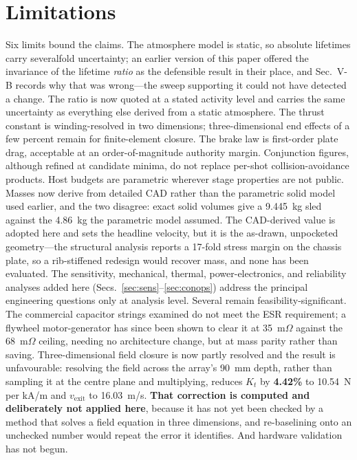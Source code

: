 \documentclass[conference]{IEEEtran}
\begin{document}
\section{Limitations}\label{sec:lim}
Six limits bound the claims. The atmosphere model is static, so absolute lifetimes carry severalfold uncertainty; an earlier version of this paper offered the invariance of the lifetime \emph{ratio} as the defensible result in their place, and Sec.~V-B records why that was wrong---the sweep supporting it could not have detected a change. The ratio is now quoted at a stated activity level and carries the same uncertainty as everything else derived from a static atmosphere. The thrust constant is winding-resolved in two dimensions; three-dimensional end effects of a few percent remain for finite-element closure. The brake law is first-order plate drag, acceptable at an order-of-magnitude authority margin. Conjunction figures, although refined at candidate minima, do not replace per-shot collision-avoidance products. Host budgets are parametric wherever stage properties are not public. Masses now derive from detailed CAD rather than the parametric solid model used earlier, and the two disagree: exact solid volumes give a 9.445~kg sled against the 4.86~kg the parametric model assumed. The CAD-derived value is adopted here and sets the headline velocity, but it is the as-drawn, unpocketed geometry---the structural analysis reports a 17-fold stress margin on the chassis plate, so a rib-stiffened redesign would recover mass, and none has been evaluated. The sensitivity, mechanical, thermal, power-electronics, and reliability analyses added here (Secs.~\ref{sec:sens}--\ref{sec:conops}) address the principal engineering questions only at analysis level. Several remain feasibility-significant. The commercial capacitor strings examined do not meet the ESR requirement; a flywheel motor-generator has since been shown to clear it at 35~m$\Omega$ against the 68~m$\Omega$ ceiling, needing no architecture change, but at mass parity rather than saving. Three-dimensional field closure is now partly resolved and the result is unfavourable: resolving the field across the array's 90~mm depth, rather than sampling it at the centre plane and multiplying, reduces $K_t$ by \textbf{4.42\%} to 10.54~N per kA/m and $v_\mathrm{exit}$ to 16.03~m/s. \textbf{That correction is computed and deliberately not applied here}, because it has not yet been checked by a method that solves a field equation in three dimensions, and re-baselining onto an unchecked number would repeat the error it identifies. And hardware validation has not begun.
\end{document}
